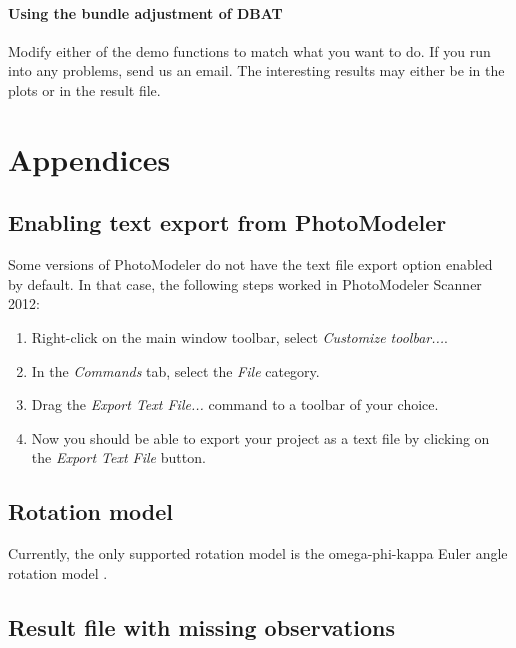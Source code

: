 \documentclass{article}
\begin{document}
\paragraph{Using the bundle adjustment of DBAT}

Modify either of the demo functions to match what you want to do. If
you run into any problems, send us an email. The interesting results
may either be in the plots or in the result file.

\newpage



\newpage

\appendix

\section{Appendices}

\subsection{Enabling text export from PhotoModeler}
\label{sec:enableTextExport}

Some versions of PhotoModeler do not have the text file export option
enabled by default. In that case, the following steps worked in
PhotoModeler Scanner 2012:
\begin{enumerate}
\item Right-click on the main window toolbar, select \emph{Customize toolbar...}.
\item In the \emph{Commands} tab, select the \emph{File} category.
\item Drag the \emph{Export Text File...} command to a toolbar of
  your choice.
\item Now you should be able to export your project as a text file by
  clicking on the \emph{Export Text File} button.
\end{enumerate}


\subsection{Rotation model}

Currently, the only supported rotation model is the omega-phi-kappa
Euler angle rotation model \citep[Ch.~2.1.2.3]{McGlone2004:Manual}.

\subsection{Result file with missing observations}
\label{sec:missingObsResultFile}
\end{document}
